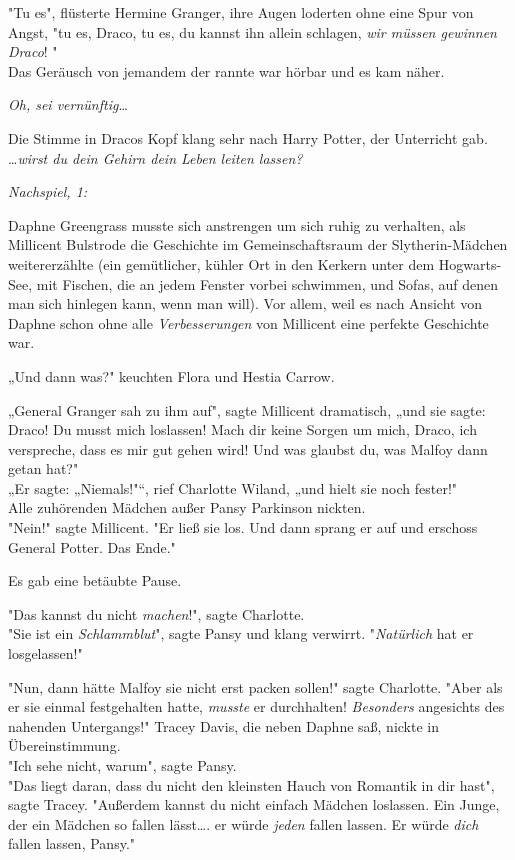 {"Tu es", flüsterte Hermine Granger, ihre Augen loderten ohne eine Spur von Angst, "tu es, Draco, tu es, du kannst ihn allein schlagen, \emph{wir müssen gewinnen Draco}! "\\ Das Geräusch von jemandem der rannte war hörbar und es kam näher.

\emph{Oh, sei vernünftig}…

Die Stimme in Dracos Kopf klang sehr nach Harry Potter, der Unterricht gab.\\ …\emph{wirst du dein Gehirn dein Leben leiten lassen?}

\emph{Nachspiel, 1:}

Daphne Greengrass musste sich anstrengen um sich ruhig zu verhalten, als Millicent Bulstrode die Geschichte im Gemeinschaftsraum der Slytherin-Mädchen weitererzählte (ein gemütlicher, kühler Ort in den Kerkern unter dem Hogwarts-See, mit Fischen, die an jedem Fenster vorbei schwimmen, und Sofas, auf denen man sich hinlegen kann, wenn man will). Vor allem, weil es nach Ansicht von Daphne schon ohne alle \emph{Verbesserungen} von Millicent eine perfekte Geschichte war.

„Und dann was?" keuchten Flora und Hestia Carrow.

„General Granger sah zu ihm auf", sagte Millicent dramatisch, „und sie sagte: Draco! Du musst mich loslassen! Mach dir keine Sorgen um mich, Draco, ich verspreche, dass es mir gut gehen wird! Und was glaubst du, was Malfoy dann getan hat?"\\ „Er sagte: „Niemals!"“, rief Charlotte Wiland, „und hielt sie noch fester!"\\ Alle zuhörenden Mädchen außer Pansy Parkinson nickten.\\ "Nein!" sagte Millicent. "Er ließ sie los. Und dann sprang er auf und erschoss General Potter. Das Ende."

Es gab eine betäubte Pause.

"Das kannst du nicht \emph{machen}!", sagte Charlotte.\\ "Sie ist ein \emph{Schlammblut}", sagte Pansy und klang verwirrt. "\emph{Natürlich} hat er losgelassen!"

"Nun, dann hätte Malfoy sie nicht erst packen sollen!" sagte Charlotte. "Aber als er sie einmal festgehalten hatte, \emph{musste} er durchhalten! \emph{Besonders} angesichts des nahenden Untergangs!" Tracey Davis, die neben Daphne saß, nickte in Übereinstimmung.\\ "Ich sehe nicht, warum", sagte Pansy.\\ "Das liegt daran, dass du nicht den kleinsten Hauch von Romantik in dir hast", sagte Tracey. "Außerdem kannst du nicht einfach Mädchen loslassen. Ein Junge, der ein Mädchen so fallen lässt…. er würde \emph{jeden} fallen lassen. Er würde \emph{dich} fallen lassen, Pansy."

}
